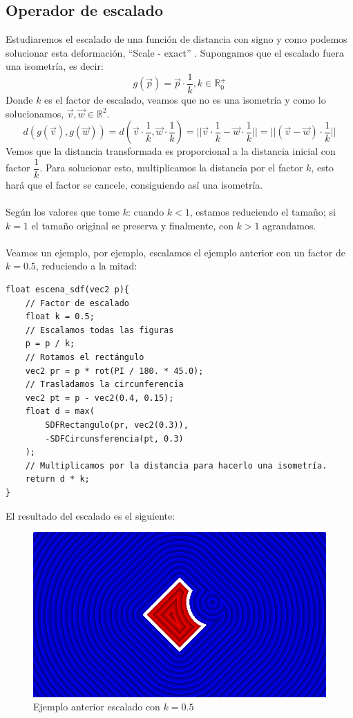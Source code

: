 \subsection{Operador de escalado}
Estudiaremos el escalado de una función de distancia con signo y como podemos solucionar esta deformación, \enquote{Scale - exact} \cite{3ddistinigo}. Supongamos que el escalado fuera una isometría, es decir:
\[g(\Vec{p})=\Vec{p}\cdot \dfrac{1}{k}, k \in \mathbb{R}^{+}_{0}\]
Donde \(k\) es el factor de escalado, veamos que no es una isometría y como lo solucionamos, \(\Vec{v},\Vec{w}\in \mathbb{R}^2\).
\[d(g(\Vec{v}),g(\Vec{w}))=d\left(\Vec{v}\cdot \dfrac{1}{k}, \Vec{w}\cdot \dfrac{1}{k}\right) = \vert\vert \Vec{v}\cdot \dfrac{1}{k} - \Vec{w}\cdot \dfrac{1}{k}\vert\vert=\vert\vert (\Vec{v} - \Vec{w})\cdot \dfrac{1}{k}\vert\vert\]
Vemos que la distancia transformada es proporcional a la distancia inicial con factor \(\dfrac{1}{k}\). Para solucionar esto, multiplicamos la distancia por el factor \(k\), esto hará que el factor se cancele, consiguiendo así una isometría.\\\\
Según los valores que tome \(k\): cuando \(k<1\), estamos reduciendo el tamaño; si \(k=1\) el tamaño original se preserva y finalmente, con \(k>1\) agrandamos.\\\\
Veamos un ejemplo, por ejemplo, escalamos el ejemplo anterior con un factor de \(k=0.5\), reduciendo a la mitad:
\begin{lstlisting}
float escena_sdf(vec2 p){
    // Factor de escalado
    float k = 0.5;
    // Escalamos todas las figuras
    p = p / k;
    // Rotamos el rectángulo
    vec2 pr = p * rot(PI / 180. * 45.0);
    // Trasladamos la circunferencia
    vec2 pt = p - vec2(0.4, 0.15);
    float d = max(
        SDFRectangulo(pr, vec2(0.3)),
        -SDFCircunsferencia(pt, 0.3)
    );
    // Multiplicamos por la distancia para hacerlo una isometría.
    return d * k;
}
\end{lstlisting}

El resultado del escalado es el siguiente:

\begin{figure}[H]
  \centering
  \captionsetup{justification=centering}%
  \includegraphics[width=1.0\textwidth]{secciones/imagenes/sdf/2d/sdf_subtracted_scale.png}
  \caption{Ejemplo anterior escalado con \(k=0.5\)}
  \label{fig:substraction}
\end{figure}

